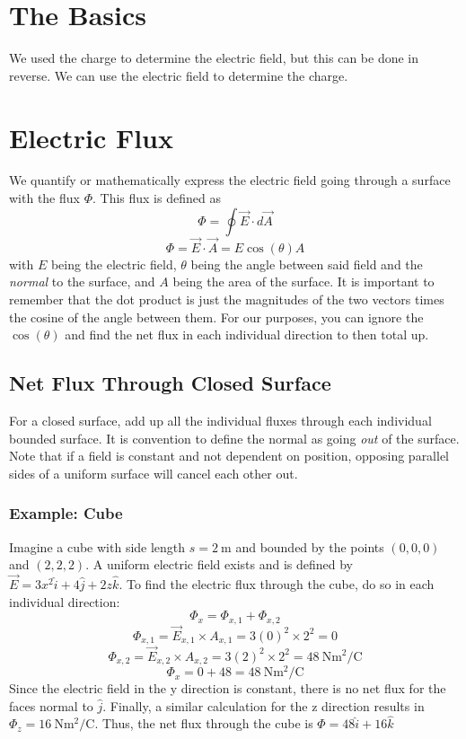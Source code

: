 \documentclass[]{article}
\begin{document}
\section{The Basics}
We used the charge to determine the electric field, but this can be done in reverse. We can use the electric field to determine the charge.

\section{Electric Flux}
We quantify or mathematically express the electric field going through a surface with the flux $ \Phi $. This flux is defined as
\[ \Phi = \oint \vec{E} \cdot d\vec{A} \]
\[ \Phi = \vec{E} \cdot \vec{A} = E \cos\left(\theta\right) A \]
with $ E $ being the electric field, $ \theta $ being the angle between said field and the \emph{normal} to the surface, and $ A $ being the area of the surface. It is important to remember that the dot product is just the magnitudes of the two vectors times the cosine of the angle between them.
For our purposes, you can ignore the $ \cos(\theta) $ and find the net flux in each individual direction to then total up.
\subsection{Net Flux Through Closed Surface}
For a closed surface, add up all the individual fluxes through each individual bounded surface. It is convention to define the normal as going \emph{out} of the surface.
Note that if a field is constant and not dependent on position, opposing parallel sides of a uniform surface will cancel each other out.
\subsubsection{Example: Cube}
Imagine a cube with side length $ s=\qty{2}{\meter} $ and bounded by the points $ (0,0,0) $ and $ (2,2,2) $. A uniform electric field exists and is defined by $ \vec{E} = 3x^2 \hat{i} + 4 \hat{j} + 2z \hat{k} $. To find the electric flux through the cube, do so in each individual direction:
\[ \Phi_x = \Phi_{x,1} + \Phi_{x,2} \]
\[ \Phi_{x,1} = \vec{E}_{x,1} \times A_{x,1} = 3(0)^2 \times 2^2 = 0 \]
\[ \Phi_{x,2} = \vec{E}_{x,2} \times A_{x,2} = 3(2)^2 \times 2^2 = \qty{48}{\newton\meter\squared\per\coulomb} \]
\[ \Phi_x = 0 + 48 = \qty{48}{\newton\meter\squared\per\coulomb} \]
Since the electric field in the y direction is constant, there is no net flux for the faces normal to $ \hat{j} $. Finally, a similar calculation for the z direction results in $ \Phi_z = \qty{16}{\newton\meter\squared\per\coulomb} $. Thus, the net flux through the cube is $ \Phi = 48 \hat{i} + 16 \hat{k} $
\end{document}
